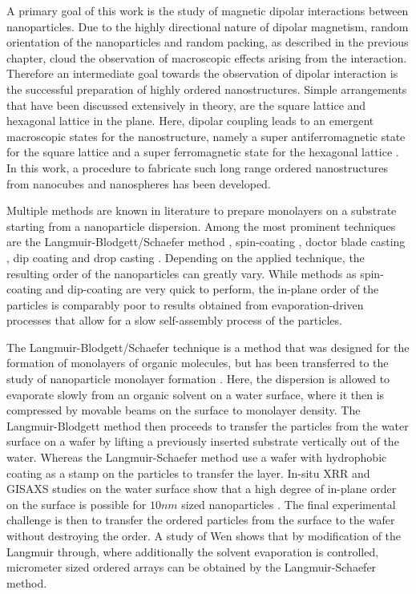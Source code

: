 \documentclass[\main/dresen_thesis.tex]{subfiles}
\begin{document}
  A primary goal of this work is the study of magnetic dipolar interactions between nanoparticles.
  Due to the highly directional nature of dipolar magnetism, random orientation of the nanoparticles and random packing, as described in the previous chapter, cloud the observation of macroscopic effects arising from the interaction.
  Therefore an intermediate goal towards the observation of dipolar interaction is the successful preparation of highly ordered nanostructures.
  Simple arrangements that have been discussed extensively in theory, are the square lattice and hexagonal lattice in the plane.
  Here, dipolar coupling leads to an emergent macroscopic states for the nanostructure, namely a super antiferromagnetic state for the square lattice and a super ferromagnetic state for the hexagonal lattice \cite{Politi_2002_Dipol, Russier_2001_Calcu, Varon_2013_Dipol}.
  In this work, a procedure to fabricate such long range ordered nanostructures from nanocubes and nanospheres has been developed.

  Multiple methods are known in literature to prepare monolayers on a substrate starting from a nanoparticle dispersion.
  Among the most prominent techniques are the Langmuir-Blodgett/Schaefer method \cite{Ukleev_2017_Selfa, Pauly_2011_Monol, Fried_2001_Order}, spin-coating \cite{Mishra_2012_Selfa}, doctor blade casting \cite{Bodnarchuk_2010_Excha}, dip coating \cite{Kim_2002_Multi} and drop casting \cite{Bigioni_2006_Kinet}.
  Depending on the applied technique, the resulting order of the nanoparticles can greatly vary.
  While methods as spin-coating and dip-coating are very quick to perform, the in-plane order of the particles is comparably poor to results obtained from evaporation-driven processes that allow for a slow self-assembly process of the particles.

  The Langmuir-Blodgett/Schaefer technique is a method that was designed for the formation of monolayers of organic molecules, but has been transferred to the study of nanoparticle monolayer formation \cite{Heitsch_2010_Gisax, Vorobiev_2015_Subst}.
  Here, the dispersion is allowed to evaporate slowly from an organic solvent on a water surface, where it then is compressed by movable beams on the surface to monolayer density.
  The Langmuir-Blodgett method then proceeds to transfer the particles from the water surface on a wafer by lifting a previously inserted substrate vertically out of the water.
  Whereas the Langmuir-Schaefer method use a wafer with hydrophobic coating as a stamp on the particles to transfer the layer.
  In-situ XRR and GISAXS studies on the water surface show that a high degree of in-plane order on the surface is possible for $10 \unit{nm}$ sized nanoparticles \cite{Vorobiev_2015_Subst}.
  The final experimental challenge is then to transfer the ordered particles from the surface to the wafer without destroying the order.
  A study of Wen \etal \cite{Wen_2011_Ultral} shows that by modification of the Langmuir through, where additionally the solvent evaporation is controlled, micrometer sized ordered arrays can be obtained by the Langmuir-Schaefer method.
\end{document}
